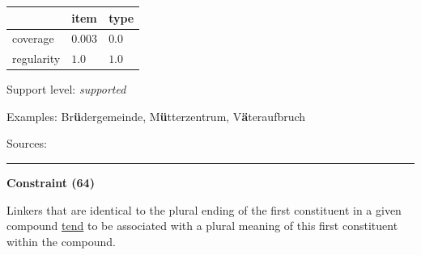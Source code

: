 \vspace{-0.35em}

\begin{table}[!ht]
\begin{center}

\begin{tabularx}{\columnwidth}{|X|X|X|}
\hline
 & item & type \\
\hline
 coverage & $0.003$ & $0.0$ \\
\hline
 regularity & $1.0$ & $1.0$ \\
\hline
\end{tabularx}
\end{center}
\end{table}

\vspace{-1.35em}

\noindent
Support level: \textit{supported}

\vspace{0.3em}

\noindent
Examples: Br\textbf{ü}der{\zeroLinker}gemeinde, M\textbf{ü}tter{\zeroLinker}zentrum, V\textbf{ä}ter{\zeroLinker}aufbruch

\vspace{0.3em}

\noindent
Sources: \citet[5]{nuebling_szczepaniak_2008}


\hrule




\vspace{0.4em}

\begin{center}
\textbf{Constraint (64)}
\end{center}

\noindent
Linkers that are identical to the plural ending of the first constituent in a given compound \underline{tend} to be associated with a plural meaning of this first constituent within the compound.
\vspace{0.35em}


